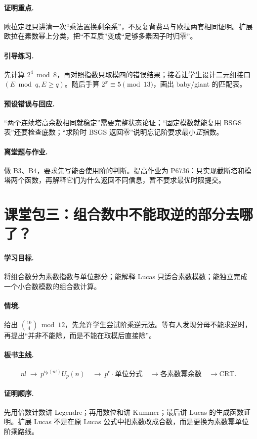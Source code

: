\documentclass[UTF8,a4paper,11pt,oneside,openany,fontset=fandol]{ctexbook}
\theoremstyle{definition}
\begin{document}
\paragraph{证明重点.} 欧拉定理只讲清一次“乘法置换剩余系”，不反复背费马与欧拉两套相同证明。扩展欧拉在素数幂上分类，把“不互质”变成“足够多素因子时归零”。
\paragraph{引导练习.} 先计算 $2^4\bmod8$，再对照指数只取模四的错误结果；接着让学生设计二元组接口 $(E\bmod q,E\ge q)$。随后手算 $2^x\equiv5\pmod{13}$，画出 baby/giant 的匹配表。
\paragraph{预设错误与回应.} “两个连续塔高余数相同就稳定”需要完整状态论证；“固定模数就能复用 BSGS 表”还要检查底数；“求阶时 BSGS 返回零”说明忘记阶要求最小\emph{正}指数。
\paragraph{离堂题与作业.} 做 B3、B4，要求先写能否使用阶的判断。提高作业为 P6736：只实现截断塔和模塔两个函数，再解释它们为什么返回不同信息，暂不要求最优时限提交。

\section{课堂包三：组合数中不能取逆的部分去哪了？}
\paragraph{学习目标.} 将组合数分为素数指数与单位部分；能解释 Lucas 只适合素数模数；能独立完成一个小合数模数的组合数计算。
\paragraph{情境.} 给出 $\binom{10}{4}\bmod12$，先允许学生尝试阶乘逆元法。等有人发现分母不能求逆时，再提出“并非不能除，而是不能在取模后直接除”。
\paragraph{板书主线.}
\[
 n!\ \longrightarrow\ p^{\nu_p(n!)}U_p(n)
 \quad\longrightarrow\ p^e\cdot\text{单位分式}
 \quad\longrightarrow\text{各素数幂余数}\quad\longrightarrow\mathrm{CRT}.
\]
\paragraph{证明顺序.} 先用倍数计数讲 Legendre；再用数位和讲 Kummer；最后讲 Lucas 的生成函数证明。扩展 Lucas 不是在原 Lucas 公式中把素数改成合数，而是更换为素数幂单位阶乘路线。
\end{document}
